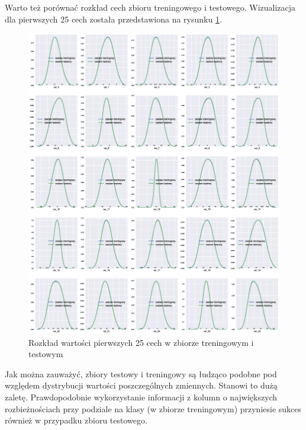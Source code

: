\documentclass[12pt]{article}
\begin{document}
Warto też porównać rozkład cech zbioru treningowego i testowego. Wizualizacja dla pierwszych 25 cech została przedstawiona na rysunku \ref{features_distribution_train_vs_test}.

\begin{figure}[H]
\centering 
\includegraphics[width = 472pt]{feature_distribution_train_vs_test.eps}
\caption{Rozkład wartości pierwszych 25 cech w zbiorze treningowym i testowym}
\label{features_distribution_train_vs_test}
\end{figure}

Jak można zauważyć, zbiory testowy i treningowy są łudząco podobne pod względem dystrybucji wartości poszczególnych zmiennych. Stanowi to dużą zaletę. Prawdopodobnie wykorzystanie informacji z kolumn o największych rozbieżnościach przy podziale na klasy (w zbiorze treningowym) przyniesie sukces również w przypadku zbioru testowego.
\end{document}

